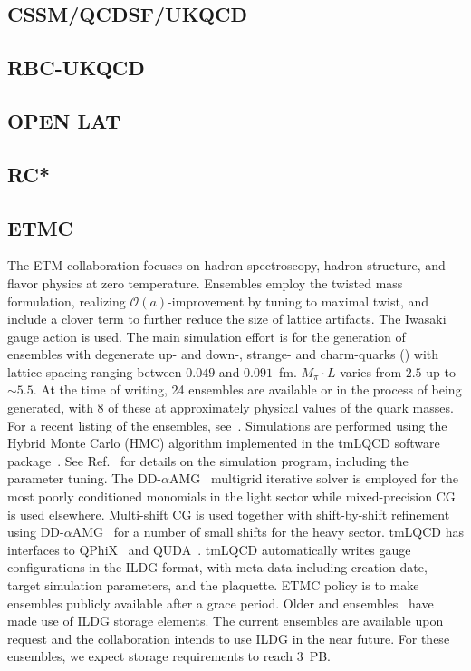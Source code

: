\documentclass[a4paper,11pt]{article}
\begin{document}
\subsection{CSSM/QCDSF/UKQCD}

\subsection{RBC-UKQCD}

\subsection{OPEN LAT}

\subsection{RC*}

\subsection{ETMC}
\begin{linenumbers}[1]
The ETM collaboration focuses on hadron spectroscopy, hadron
structure, and flavor physics at zero temperature. Ensembles employ
the twisted mass formulation, realizing $\mathcal{O}(a)$-improvement
by tuning to maximal twist, and include a clover term to further
reduce the size of lattice artifacts. The Iwasaki gauge action is
used. The main simulation effort is for the generation of ensembles
with degenerate up- and down-, strange- and charm-quarks
() with lattice spacing ranging between $0.049$ and
$0.091$~fm. $M_\pi\cdot L$ varies from $2.5$ up to ${\sim}5.5$. At the
time of writing, 24 ensembles are available or in the process of being
generated, with 8 of these at approximately physical values of the
quark masses. For a recent listing of the ensembles,
see~\cite{ETMCPoster:2024}. Simulations are performed using the Hybrid
Monte Carlo (HMC) algorithm implemented in the tmLQCD software
package~\cite{Jansen:2009xp,Deuzeman:2013xaa,Abdel-Rehim:2013wba}. See
Ref.~\cite{Alexandrou:2018egz} for details on the simulation program,
including the parameter tuning. The
DD-$\alpha$AMG~\cite{Frommer:2013fsa,Alexandrou:2016izb} multigrid
iterative solver is employed for the most poorly conditioned monomials
in the light sector while mixed-precision CG is used
elsewhere. Multi-shift CG is used together with shift-by-shift
refinement using DD-$\alpha$AMG~\cite{Alexandrou:2018wiv} for a number
of small shifts for the heavy sector. tmLQCD has interfaces to
QPhiX~\cite{Joo:2013lwm} and QUDA~\cite{Clark:2009wm,Babich:2011np}.
tmLQCD automatically writes gauge configurations in the ILDG format,
with meta-data including creation date, target simulation parameters,
and the plaquette. ETMC policy is to make ensembles publicly
available after a grace period. Older  and 
ensembles~\cite{Baron:2010bv,EuropeanTwistedMass:2010voq,ETM:2009ztk}
have made use of ILDG storage elements. The current ensembles are
available upon request and the collaboration intends to use ILDG in
the near future. For these ensembles, we expect storage requirements
to reach 3~PB.
\end{linenumbers}
\end{document}

